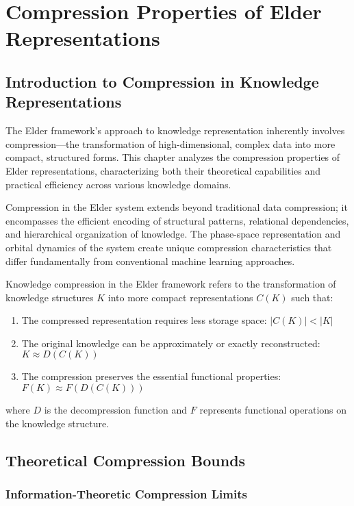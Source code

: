 \chapter{Compression Properties of Elder Representations}

\section{Introduction to Compression in Knowledge Representations}

The Elder framework's approach to knowledge representation inherently involves compression—the transformation of high-dimensional, complex data into more compact, structured forms. This chapter analyzes the compression properties of Elder representations, characterizing both their theoretical capabilities and practical efficiency across various knowledge domains.

Compression in the Elder system extends beyond traditional data compression; it encompasses the efficient encoding of structural patterns, relational dependencies, and hierarchical organization of knowledge. The phase-space representation and orbital dynamics of the system create unique compression characteristics that differ fundamentally from conventional machine learning approaches.

\begin{definition}
Knowledge compression in the Elder framework refers to the transformation of knowledge structures $K$ into more compact representations $C(K)$ such that:
\begin{enumerate}
    \item The compressed representation requires less storage space: $|C(K)| < |K|$
    \item The original knowledge can be approximately or exactly reconstructed: $K \approx D(C(K))$
    \item The compression preserves the essential functional properties: $F(K) \approx F(D(C(K)))$
\end{enumerate}
where $D$ is the decompression function and $F$ represents functional operations on the knowledge structure.
\end{definition}

\section{Theoretical Compression Bounds}

\subsection{Information-Theoretic Compression Limits}

